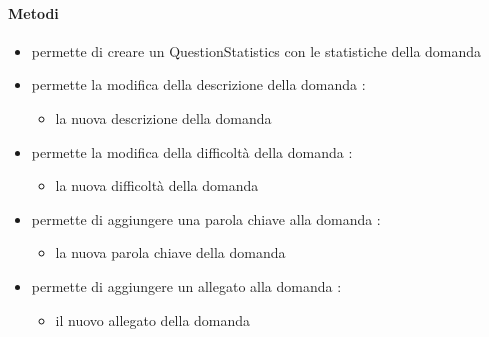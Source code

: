\paragraph{Metodi}
\begin{itemize}
\item {}
\newline
permette di creare un QuestionStatistics con le statistiche della domanda
\newline
\item {}
\newline
permette la modifica della descrizione della domanda
\newline
{} :
\begin{itemize}
\item {}
\newline
la nuova descrizione della domanda
\end{itemize}
\item {}
\newline
permette la modifica della difficoltà della domanda
\newline
{} :
\begin{itemize}
\item {}
\newline
la nuova difficoltà della domanda
\end{itemize}
\item {}
\newline
permette di aggiungere una parola chiave alla domanda
\newline
{} :
\begin{itemize}
\item {}
\newline
la nuova parola chiave della domanda
\end{itemize}
\item {}
\newline
permette di aggiungere un allegato alla domanda
\newline
{} :
\begin{itemize}
\item {}
\newline
il nuovo allegato della domanda

\end{itemize}
\end{itemize}
